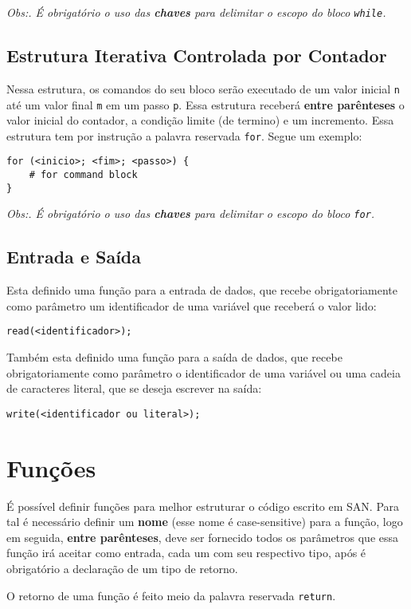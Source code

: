 \documentclass[a4paper,11pt]{article}
\begin{document}
\textit{Obs:. É obrigatório o uso das \textbf{chaves} para delimitar o escopo do bloco \texttt{while}.}

\subsection{Estrutura Iterativa Controlada por Contador}
Nessa estrutura, os comandos do seu bloco serão executado de um valor inicial \texttt{n} até um
valor final \texttt{m} em um passo \texttt{p}. Essa estrutura receberá \textbf{entre parênteses}
o valor inicial do contador, a condição limite (de termino) e um incremento. Essa estrutura tem
por instrução a palavra reservada \texttt{for}. Segue um exemplo:
\begin{lstlisting}
for (<inicio>; <fim>; <passo>) {
    # for command block
}
\end{lstlisting}

\textit{Obs:. É obrigatório o uso das \textbf{chaves} para delimitar o escopo do bloco \texttt{for}.}

\subsection{Entrada e Saída}
Esta definido uma função para a entrada de dados, que recebe obrigatoriamente como parâmetro
um identificador de uma variável que receberá o valor lido:
\begin{lstlisting}
read(<identificador>);
\end{lstlisting}

Também esta definido uma função para a saída de dados, que recebe obrigatoriamente como parâmetro
o identificador de uma variável ou uma cadeia de caracteres literal, que se deseja escrever na saída:
\begin{lstlisting}
write(<identificador ou literal>);
\end{lstlisting}

\section{Funções}
É possível definir funções para melhor estruturar o código escrito em SAN. Para tal é necessário
definir um \textbf{nome} (esse nome é case-sensitive) para a função, logo em seguida,
\textbf{entre parênteses}, deve ser fornecido todos os parâmetros que essa função irá aceitar como
entrada, cada um com seu respectivo tipo, após é obrigatório a declaração de um tipo de retorno.

O retorno de uma função é feito meio da palavra reservada \texttt{return}.
\end{document}
